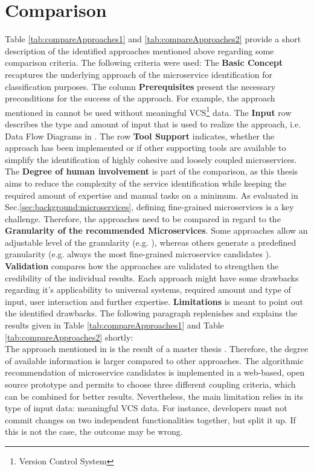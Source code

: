 \section{Comparison} 
\label{sec:stateOfTheArt:comparison}

Table \ref{tab:compareApproaches1} and \ref{tab:compareApproaches2} provide a short description of the identified approaches mentioned above regarding some comparison criteria. The following criteria were used: The \textbf{Basic Concept} recaptures the underlying approach of the microservice identification for classification purposes. The column \textbf{Prerequisites} present the necessary preconditions for the success of the approach. For example, the approach mentioned in \cite{ExtractionMazlami} cannot be used without meaningful VCS\footnote{Version Control System} data. The \textbf{Input} row describes the type and amount of input that is used to realize the approach, i.e. Data Flow Diagrams in \cite{DataflowDrivenChen}. The row \textbf{Tool Support} indicates, whether the approach has been implemented or if other supporting tools are available to simplify the identification of highly cohesive and loosely coupled microservices. The \textbf{Degree of human involvement} is part of the comparison, as this thesis aims to reduce the complexity of the service identification while keeping the required amount of expertise and manual tasks on a minimum. As evaluated in Sec.\ref{sec:background:microservices}, defining fine-grained microservices is a key challenge. Therefore, the approaches need to be compared in regard to the \textbf{Granularity of the recommended Microservices}. Some approaches allow an adjustable level of the granularity (e.g. \cite{ExtractionMazlami}), whereas others generate a predefined granularity (e.g. always the most fine-grained microservice candidates \cite{HeuristicsAlwis}). \textbf{Validation} compares how the approaches are validated to strengthen the credibility of the individual results. Each approach might have some drawbacks regarding it's applicability to universal systems, required amount and type of input, user interaction and further expertise. \textbf{Limitations} is meant to point out the identified drawbacks. The following paragraph replenishes and explains the results given in Table \ref{tab:compareApproaches1} and Table \ref{tab:compareApproaches2} shortly: \\

\noindent
The approach mentioned in \cite{ExtractionMazlami} is the result of a master thesis \cite{Mazlami}. Therefore, the degree of available information is larger compared to other approaches. The algorithmic recommendation of microservice candidates is implemented in a web-based, open source prototype and permits to choose three different coupling criteria, which can be combined for better results. Nevertheless, the main limitation relies in its type of input data: meaningful VCS data. For instance, developers must not commit changes on two independent functionalities together, but split it up. If this is not the case, the outcome may be wrong. \\

